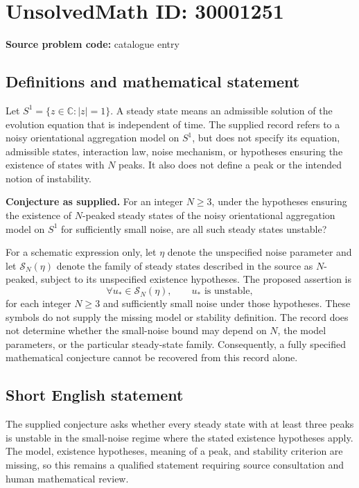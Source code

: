 \documentclass[11pt]{article}
\newcommand{\C}{\mathbb{C}}
\begin{document}
\section*{UnsolvedMath ID: 30001251}
\textbf{Source problem code:} catalogue entry
\subsection{Definitions and mathematical statement}
Let \(S^1=\{z\in\C:|z|=1\}\). A steady state means an admissible solution of the evolution equation that is independent of time. The supplied record refers to a noisy orientational aggregation model on \(S^1\), but does not specify its equation, admissible states, interaction law, noise mechanism, or hypotheses ensuring the existence of states with \(N\) peaks. It also does not define a peak or the intended notion of instability.

\textbf{Conjecture as supplied.} For an integer \(N\geq 3\), under the hypotheses ensuring the existence of \(N\)-peaked steady states of the noisy orientational aggregation model on \(S^1\) for sufficiently small noise, are all such steady states unstable?

For a schematic expression only, let \(\eta\) denote the unspecified noise parameter and let \(\mathcal S_N(\eta)\) denote the family of steady states described in the source as \(N\)-peaked, subject to its unspecified existence hypotheses. The proposed assertion is
\[
\forall u_*\in\mathcal S_N(\eta),\qquad u_*\text{ is unstable},
\]
for each integer \(N\geq3\) and sufficiently small noise under those hypotheses. These symbols do not supply the missing model or stability definition. The record does not determine whether the small-noise bound may depend on \(N\), the model parameters, or the particular steady-state family. Consequently, a fully specified mathematical conjecture cannot be recovered from this record alone.
\subsection{Short English statement}
The supplied conjecture asks whether every steady state with at least three peaks is unstable in the small-noise regime where the stated existence hypotheses apply. The model, existence hypotheses, meaning of a peak, and stability criterion are missing, so this remains a qualified statement requiring source consultation and human mathematical review.
\end{document}
